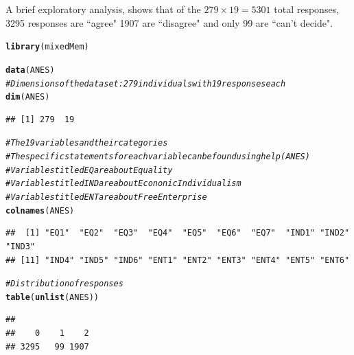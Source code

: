 \documentclass{article}\usepackage[]{graphicx}\usepackage[]{color}
\makeatletter
\newcommand{\hlcom}[1]{\textcolor[rgb]{0.678,0.584,0.686}{\textit{#1}}}%
\newcommand{\hlstd}[1]{\textcolor[rgb]{0.345,0.345,0.345}{#1}}%
\newcommand{\hlkwd}[1]{\textcolor[rgb]{0.737,0.353,0.396}{\textbf{#1}}}%
\newenvironment{kframe}{%
 \def\at@end@of@kframe{}%
 \ifinner\ifhmode%
  \def\at@end@of@kframe{\end{minipage}}%
  \begin{minipage}{\columnwidth}%
 \fi\fi%
 \def\FrameCommand##1{\hskip\@totalleftmargin \hskip-\fboxsep
 \colorbox{shadecolor}{##1}\hskip-\fboxsep
     \hskip-\linewidth \hskip-\@totalleftmargin \hskip\columnwidth}%
 \MakeFramed {\advance\hsize-\width
   \@totalleftmargin\z@ \linewidth\hsize
   \@setminipage}}%
 {\par\unskip\endMakeFramed%
 \at@end@of@kframe}
\newenvironment{knitrout}{}{} %
\renewenvironment{knitrout}{\begin{singlespace}}{\end{singlespace}}
\makeatother
\begin{document}
A brief exploratory analysis, shows that of the $279 \times 19 = 5301$ total responses, 3295 responses are ``agree" 1907 are ``disagree" and only 99 are ``can't decide".



\begin{knitrout}
\color{fgcolor}\begin{kframe}
\begin{alltt}
\hlkwd{library}\hlstd{(mixedMem)}
\end{alltt}


{\ttfamily\noindent\itshape\color{messagecolor}{\#\# Loading required package: gtools}}\begin{alltt}
\hlkwd{data}\hlstd{(ANES)}
\hlcom{# Dimensions of the data set: 279 individuals with 19 responses each}
\hlkwd{dim}\hlstd{(ANES)}
\end{alltt}
\begin{verbatim}
## [1] 279  19
\end{verbatim}
\begin{alltt}
\hlcom{# The 19 variables and their categories}
\hlcom{# The specific statements for each variable can be found using help(ANES)}
\hlcom{# Variables titled EQ are about Equality}
\hlcom{# Variables titled IND are about Econonic Individualism}
\hlcom{# Variables titled ENT are about Free Enterprise}
\hlkwd{colnames}\hlstd{(ANES)}
\end{alltt}
\begin{verbatim}
##  [1] "EQ1"  "EQ2"  "EQ3"  "EQ4"  "EQ5"  "EQ6"  "EQ7"  "IND1" "IND2" "IND3"
## [11] "IND4" "IND5" "IND6" "ENT1" "ENT2" "ENT3" "ENT4" "ENT5" "ENT6"
\end{verbatim}
\begin{alltt}
\hlcom{# Distribution of responses}
\hlkwd{table}\hlstd{(}\hlkwd{unlist}\hlstd{(ANES))}
\end{alltt}
\begin{verbatim}
## 
##    0    1    2 
## 3295   99 1907
\end{verbatim}
\end{kframe}
\end{knitrout}
\end{document}
